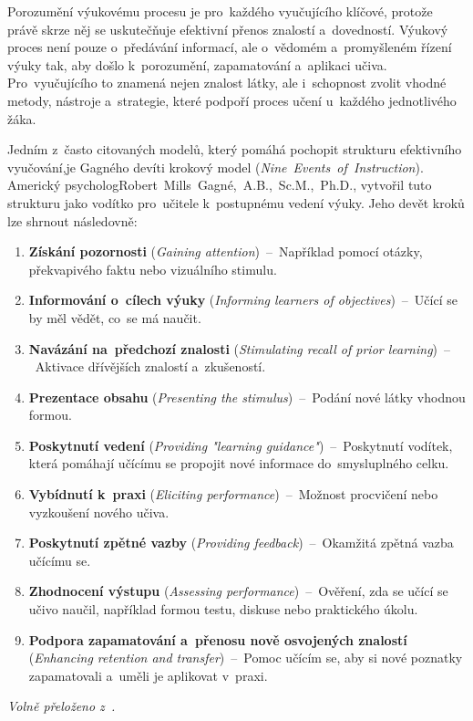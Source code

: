 \documentclass[male,czech,api_bc]{kitheses}
\begin{document}
Porozumění výukovému procesu je pro~každého vyučujícího klíčové, protože právě skrze něj se uskutečňuje efektivní přenos znalostí a~dovedností. Výukový proces není pouze o~předávání informací, ale o~vědomém a~promyšleném řízení výuky tak, aby došlo k~porozumění, zapamatování a~aplikaci učiva. Pro~vyučujícího to znamená nejen znalost látky, ale i~schopnost zvolit vhodné metody, nástroje a~strategie, které podpoří proces učení u~každého jednotlivého žáka.

Jedním z~často citovaných modelů, který pomáhá pochopit strukturu efektivního vyučování,\break je Gagného devíti krokový model (\textit{Nine~Events~of~Instruction}). Americký psycholog\break\mbox{Robert~Mills~Gagné,~A.B.,~Sc.M.,~Ph.D.}, vytvořil tuto strukturu jako vodítko pro~učitele k~postupnému vedení výuky. Jeho devět kroků lze shrnout následovně:

\begin{enumerate}
	\item \textbf{Získání pozornosti} (\textit{Gaining attention})~--~Například pomocí otázky, překvapivého faktu nebo vizuálního stimulu.
	\item \textbf{Informování o~cílech výuky} (\textit{Informing learners of objectives})~--~Učící se by měl vědět, co~se má naučit.
	\item \textbf{Navázání na~předchozí znalosti} (\textit{Stimulating recall of prior learning})~--~Aktivace dřívějších znalostí a~zkušeností.
	\item \textbf{Prezentace obsahu} (\textit{Presenting the stimulus})~--~Podání nové látky vhodnou formou.
	\item \textbf{Poskytnutí vedení} (\textit{Providing "learning guidance"})~--~Poskytnutí vodítek, která pomáhají učícímu se propojit nové informace do~smysluplného celku.
	\item \textbf{Vybídnutí k~praxi} (\textit{Eliciting performance})~--~Možnost procvičení nebo vyzkoušení nového učiva.
	\item \textbf{Poskytnutí zpětné vazby} (\textit{Providing feedback})~--~Okamžitá zpětná vazba učícímu se.
	\item \textbf{Zhodnocení výstupu} (\textit{Assessing performance})~--~Ověření, zda se učící se učivo naučil, například formou testu, diskuse nebo praktického úkolu.
	\item \textbf{Podpora zapamatování a~přenosu nově osvojených znalostí} (\textit{Enhancing retention and transfer})~--~Pomoc učícím se, aby si nové poznatky zapamatovali a~uměli je aplikovat v~praxi.
\end{enumerate}
\noindent
\textit{Volně přeloženo z~\cite[s.~246]{gagne1985conditions}.}
\end{document}

